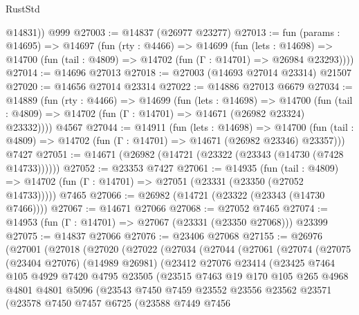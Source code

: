\begin{lexlean}{RustStd}
\begin{coremodule}
        @14831))
    @999
@27003 := @14837 (@26977 @23277)
@27013 := fun (params : @14695) =>
  @14697
    (fun (rty : @4466) =>
    @14699
      (fun (lets : @14698) =>
      @14700 (fun (tail : @4809) => @14702 (fun (Γ : @14701) => @26984 @23293))))
@27014 := @14696 @27013
@27018 := @27003 (@14693 @27014 @23314) @21507
@27020 := @14656 @27014 @23314
@27022 := @14886 @27013 @6679
@27034 := @14889
    (fun (rty : @4466) =>
    @14699
      (fun (lets : @14698) =>
      @14700 (fun (tail : @4809) => @14702 (fun (Γ : @14701) => @14671 (@26982 @23324) @23332))))
    @4567
@27044 := @14911
    (fun (lets : @14698) =>
    @14700 (fun (tail : @4809) => @14702 (fun (Γ : @14701) => @14671 (@26982 @23346) @23357)))
    @7427
@27051 := @14671 (@26982 (@14721 (@23322 (@23343 (@14730 (@7428 @14733))))))
@27052 := @23353 @7427
@27061 := @14935
    (fun (tail : @4809) => @14702 (fun (Γ : @14701) => @27051 (@23331 (@23350 (@27052 @14733)))))
    @7465
@27066 := @26982 (@14721 (@23322 (@23343 (@14730 @7466))))
@27067 := @14671 @27066
@27068 := @27052 @7465
@27074 := @14953 (fun (Γ : @14701) => @27067 (@23331 (@23350 @27068))) @23399
@27075 := @14837 @27066
@27076 := @23406 @27068
@27155 := @26976
    (@27001
      (@27018
        (@27020
          (@27022
            (@27034
              (@27044
                (@27061
                  (@27074
                    (@27075
                      (@23404 @27076)
                      (@14989 @26981)
                      (@23412
                        @27076
                        @23414
                        (@23425
                          @7464
                          @105
                          @4929
                          @7420
                          @4795
                          @23505
                          (@23515
                            @7463
                            @19
                            @170
                            @105
                            @265
                            @4968
                            @4801
                            @4801
                            @5096
                            (@23543
                              @7450
                              @7459
                              @23552
                              @23556
                              @23562
                              @23571
                              (@23578
                                @7450
                                @7457
                                @6725
                                (@23588
                                  @7449
                                  @7456

\end{coremodule}
\end{lexlean}
